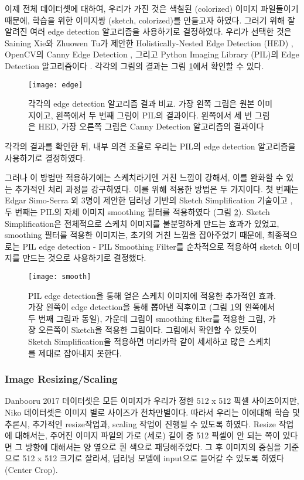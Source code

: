 이제 전체 데이터셋에 대하여, 우리가 가진 것은 색칠된 (colorized) 이미지 파일들이기 때문에, 학습을 위한 이미지쌍 (sketch, colorized)를 만들고자 하였다. 그러기 위해 잘 알려진 여러 edge detection 알고리즘을 사용하기로 결정하였다.
우리가 선택한 것은 Saining Xie와 Zhuowen Tu가 제안한 Holistically-Nested Edge Detection (HED) \cite{Saining2015}, OpenCV의 Canny Edge Detection \cite{opencv}, 그리고 Python Imaging Library (PIL)의 Edge Detection 알고리즘이다 \cite{pillow}. 각각의 그림의 결과는 그림 \ref{fig:edge_detection}에서 확인할 수 있다.
\begin{figure}[t]
	\centering
	\texttt{[image: edge]}
	\caption{각각의 edge detection 알고리즘 결과 비교. 가장 왼쪽 그림은 원본 이미지이고, 왼쪽에서 두 번째 그림이 PIL의 결과이다. 왼쪽에서 세 번 그림은 HED, 가장 오른쪽 그림은 Canny Detection 알고리즘의 결과이다}
	\label{fig:edge_detection}
\end{figure}
각각의 결과를 확인한 뒤, 내부 의견 조율로 우리는 PIL의 edge detection 알고리즘을 사용하기로 결정하였다. 

그러나 이 방법만 적용하기에는 스케치라기엔 거친 느낌이 강해서, 이를 완화할 수 있는 추가적인 처리 과정을 강구하였다.
이를 위해 적용한 방법은 두 가지이다.
첫 번째는 Edgar Simo-Serra 외 3명이 제안한 딥러닝 기반의 Sketch Simplification 기술이고 \cite{SimoSerraTOG2018}, 두 번째는 PIL의 자체 이미지 smoothing 필터를 적용하였다 (그림 \ref{fig:edge_smooth}).
Sketch Simplification은 전체적으로 스케치 이미지를 불분명하게 만드는 효과가 있었고, smoothing 필터를 적용한 이미지는, 초기의 거친 느낌을 잡아주었기 때문에, 최종적으로는 PIL edge detection - PIL Smoothing Filter를 순차적으로 적용하여 sketch 이미지를 만드는 것으로 사용하기로 결정했다.
\begin{figure}[t]
	\centering
	\texttt{[image: smooth]}
	\caption{PIL edge detection을 통해 얻은 스케치 이미지에 적용한 추가적인 효과. 가장 왼쪽이 edge detection을 통해 뽑아낸 직후이고 (그림 \ref{fig:edge_detection}의 왼쪽에서 두 번째 그림과 동일), 가운데 그림이 smoothing filter를 적용한 그림, 가장 오른쪽이 Sketch을 적용한 그림이다. 그림에서 확인할 수 있듯이 Sketch Simplification을 적용하면 머리카락 같이 세세하고 많은 스케치를 제대로 잡아내지 못한다.}
	\label{fig:edge_smooth}
\end{figure}

\subsubsection{Image Resizing/Scaling}

Danbooru 2017 데이터셋은 모든 이미지가 우리가 정한 512 x 512 픽셀 사이즈이지만, Niko 데이터셋은 이미지 별로 사이즈가 천차만별이다.
따라서 우리는 이에대해 학습 및 추론시, 추가적인 resize작업과, scaling 작업이 진행될 수 있도록 하였다.
Resize 작업에 대해서는, 주어진 이미지 파일의 가로 (세로) 길이 중 512 픽셀이 안 되는 쪽이 있다면 그 방향에 대해서는 양 옆으로 흰 색으로 패딩해주었다.
그 후 이미지의 중심을 기준으로 512 x 512 크기로 잘라서, 딥러닝 모델에 input으로 들어갈 수 있도록 하였다 (Center Crop).


